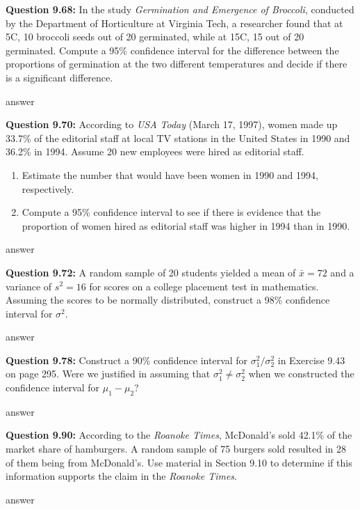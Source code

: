 \documentclass{article}
\begin{document}
\textbf{Question 9.68:}
In the study \textit{Germination and Emergence of
Broccoli}, conducted by the Department of Horticulture
at Virginia Tech, a researcher found that at 5\textdegree C, 10
broccoli seeds out of 20 germinated, while at 15\textdegree C, 15
out of 20 germinated. Compute a 95\% confidence interval 
for the difference between the proportions of germination 
at the two different temperatures and decide if there is a 
significant difference.
\begin{description}
    \item answer
\end{description}

\textbf{Question 9.70:}
According to \textit{USA Today} (March 17, 1997),
women made up 33.7\% of the editorial staff at local
TV stations in the United States in 1990 and 36.2\% in
1994. Assume 20 new employees were hired as editorial
staff.
\begin{enumerate}[label = (\alph*) ]
    \item Estimate the number that would have been women
    in 1990 and 1994, respectively.
    \item  Compute a 95\% confidence interval to see if there
    is evidence that the proportion of women hired as
    editorial staff was higher in 1994 than in 1990.
\end{enumerate}
\begin{description}
    \item answer
\end{description}

\textbf{Question 9.72:}
A random sample of 20 students yielded a mean
of $\bar{x} = 72$ and a variance of $s^2 = 16$ for scores on a
college placement test in mathematics. Assuming the
scores to be normally distributed, construct a 98\% 
confidence interval for $\sigma^2$.
\begin{description}
    \item answer
\end{description}

\textbf{Question 9.78:}
Construct a 90\% confidence interval for $\sigma^2_1 / \sigma^2_2$ 
in Exercise 9.43 on page 295. Were we justified in assuming that 
$\sigma^2_1 \not= \sigma^2_2$ when we constructed the confidence
interval for $\mu_1 − \mu_2$?
\begin{description}
    \item answer
\end{description}

\textbf{Question 9.90:}
According to the \textit{Roanoke Times}, McDonald’s
sold 42.1\% of the market share of hamburgers. A random 
sample of 75 burgers sold resulted in 28 of them
being from McDonald’s. Use material in Section 9.10
to determine if this information supports the claim in
the \textit{Roanoke Times}.
\begin{description}
    \item answer
\end{description}
\end{document}
